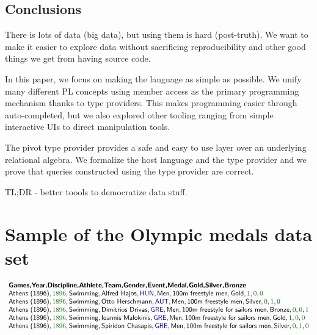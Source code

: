 \documentclass[a4paper,UKenglish]{lipics-v2016}
\theoremstyle{plain}
\theoremstyle{definition}
\newcommand{\num}[1]{\textcolor{numclr}{#1}}
\newcommand{\kvd}[1]{\textnormal{\textcolor{kvdclr}{\sffamily #1}}}
\newcommand{\ident}[1]{\textnormal{\sffamily #1}}
\begin{document}
\subsection{Conclusions}
There is lots of data (big data), but using them is hard (post-truth).
We want to make it easier to explore data without sacrificing reproducibility 
and other good things we get from having source code.

In this paper, we focus on making the language as simple as possible. We unify many different
PL concepts using member access as the primary programming mechanism thanks to type providers.
This makes programming easier through auto-completed, but we also explored other tooling ranging
from simple interactive UIs to direct manipulation tools.

The pivot type provider provides a safe and easy to use layer over an underlying 
relational algebra. We formalize the host language and the type provider and we prove
that queries constructed using the type provider are correct.

TL;DR - better toools to democratize data stuff.






\appendix
\section{Sample of the Olympic medals data set}
\label{app:olympics-csv}

{\small
\begin{equation*}
\begin{array}{l}
\textbf{\sffamily {Games},{Year},{Discipline},{Athlete},{Team},{Gender},{Event},{Medal},{Gold},{Silver},{Bronze}}\\
\ident{Athens (1896)},\num{1896},\ident{Swimming},\ident{Alfred Hajos},\kvd{HUN},\ident{Men},\ident{100m freestyle men},\ident{Gold},\num{1},\num{0},\num{0}\\
\ident{Athens (1896)},\num{1896},\ident{Swimming},\ident{Otto Herschmann},\kvd{AUT},\ident{Men},\ident{100m freestyle men},\ident{Silver},\num{0},\num{1},\num{0}\\
\ident{Athens (1896)},\num{1896},\ident{Swimming},\ident{Dimitrios Drivas},\kvd{GRE},\ident{Men},\ident{100m freestyle for sailors men},\ident{Bronze},\num{0},\num{0},\num{1}\\
\ident{Athens (1896)},\num{1896},\ident{Swimming},\ident{Ioannis Malokinis},\kvd{GRE},\ident{Men},\ident{100m freestyle for sailors men},\ident{Gold},\num{1},\num{0},\num{0}\\
\ident{Athens (1896)},\num{1896},\ident{Swimming},\ident{Spiridon Chasapis},\kvd{GRE},\ident{Men},\ident{100m freestyle for sailors men},\ident{Silver},\num{0},\num{1},\num{0}\\
\end{array}
\end{equation*} }




\end{document}

